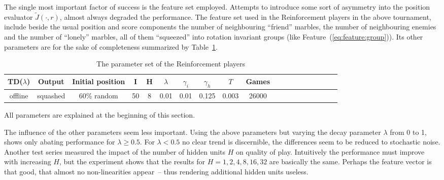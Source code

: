 The single most important factor of success is the feature set employed. Attempts to introduce some sort of asymmetry into the position evaluator $\tilde J(\cdot,r)$, almost always degraded the performance. The feature set used in the Reinforcement players in the above tournament, include beside the usual position and score components the number of neighbouring ``friend'' marbles, the number of neighbouring enemies and the number of ``lonely'' marbles, all of them ``squeezed'' into rotation invariant groups (like Feature~(\ref{eq:feature:group})). Its other parameters are for the sake of completeness summarized by  Table~\ref{tab:reinforcement}.
\begin{table}[htbp]
\begin{center}
\caption{The parameter set of the Reinforcement players} \label{tab:reinforcement}
\medskip
\begin{tabular}{ccccccccccccccccccc}
TD($\lambda$) &  Output & Initial position & I & H & $\lambda$ & $\gamma_i$ & $\gamma_h$ & $T$ & Games
\\ \hline 
offline & squashed & 60\% random 
& 50 & 8 & 0.01 & 0.01 & 0.125 & 0.003 & 26000
\end{tabular}
\end{center}
\begin{center}
\footnotesize
All parameters are explained at the beginning of this section.
\end{center}
\end{table}

The influence of the other parameters seem less important. Using the above parameters but varying the decay parameter $\lambda$ from 0 to 1, shows only abating performance for $\lambda \geq 0.5$. For $\lambda < 0.5$ no clear trend is discernible, the differences seem to be reduced to stochastic noise. Another test series measured the impact of the number of hidden units $H$ on quality of play. Intuitively the performance must improve with increasing $H$, but the experiment shows that the results for $H = 1,2,4,8,16,32$ are basically the same. Perhaps the feature vector is that good, that almost no non-linearities appear~-- thus rendering additional hidden units useless.